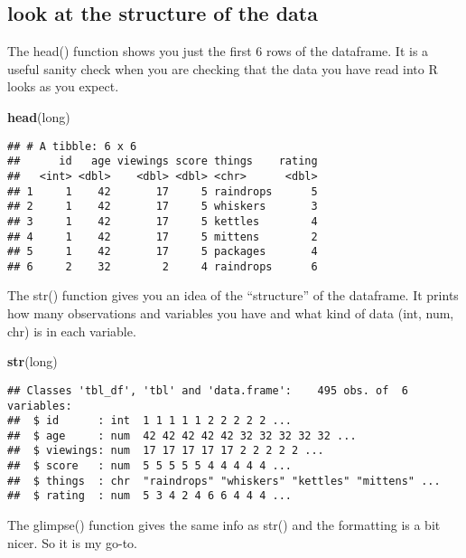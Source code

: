 \documentclass[]{article}
\newenvironment{Shaded}{\begin{snugshade}}{\end{snugshade}}
\newcommand{\KeywordTok}[1]{\textcolor[rgb]{0.13,0.29,0.53}{\textbf{#1}}}
\newcommand{\NormalTok}[1]{#1}
\begin{document}
\hypertarget{look-at-the-structure-of-the-data}{%
\subsection{look at the structure of the
data}\label{look-at-the-structure-of-the-data}}

The head() function shows you just the first 6 rows of the dataframe. It
is a useful sanity check when you are checking that the data you have
read into R looks as you expect.

\begin{Shaded}
\begin{Highlighting}[]
\KeywordTok{head}\NormalTok{(long)}
\end{Highlighting}
\end{Shaded}

\begin{verbatim}
## # A tibble: 6 x 6
##      id   age viewings score things    rating
##   <int> <dbl>    <dbl> <dbl> <chr>      <dbl>
## 1     1    42       17     5 raindrops      5
## 2     1    42       17     5 whiskers       3
## 3     1    42       17     5 kettles        4
## 4     1    42       17     5 mittens        2
## 5     1    42       17     5 packages       4
## 6     2    32        2     4 raindrops      6
\end{verbatim}

The str() function gives you an idea of the ``structure'' of the
dataframe. It prints how many observations and variables you have and
what kind of data (int, num, chr) is in each variable.

\begin{Shaded}
\begin{Highlighting}[]
\KeywordTok{str}\NormalTok{(long)}
\end{Highlighting}
\end{Shaded}

\begin{verbatim}
## Classes 'tbl_df', 'tbl' and 'data.frame':    495 obs. of  6 variables:
##  $ id      : int  1 1 1 1 1 2 2 2 2 2 ...
##  $ age     : num  42 42 42 42 42 32 32 32 32 32 ...
##  $ viewings: num  17 17 17 17 17 2 2 2 2 2 ...
##  $ score   : num  5 5 5 5 5 4 4 4 4 4 ...
##  $ things  : chr  "raindrops" "whiskers" "kettles" "mittens" ...
##  $ rating  : num  5 3 4 2 4 6 6 4 4 4 ...
\end{verbatim}

The glimpse() function gives the same info as str() and the formatting
is a bit nicer. So it is my go-to.
\end{document}
